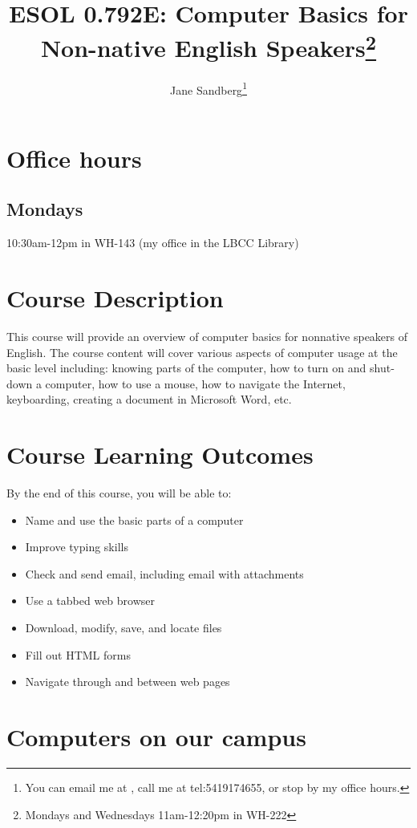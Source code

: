 \documentclass[12pt,article,oneside]{memoir}
\author{Jane Sandberg\thanks{You can email me at \htmladdnormallink{sandbej at linnbenton dot edu}{mailto:sandbej@linnbenton.edu}, call me at \htmladdnormallink{(541) 917 4655}	{tel:5419174655}, or stop by my office hours.}}
\title{ESOL 0.792E: Computer Basics for Non-native English Speakers\thanks{Mondays and Wednesdays 11am-12:20pm in WH-222}}
\begin{document}
\renewcommand{\labelitemi}{$\triangleright$}
\setcounter{secnumdepth}{0}
\tightlists


\maketitle

\begin{htmlonly}
\tableofcontents
\end{htmlonly}
\section{Office hours}

\subsection{Mondays}
10:30am-12pm in WH-143 (my office in the LBCC Library)

\section{Course Description}
This course will provide an overview of computer basics for non­native speakers of English. The course content will cover various aspects of computer usage at the basic level including: knowing parts of the computer, how to turn on and shut­down a computer, how to use a mouse, how to navigate the Internet, keyboarding, creating a document in Microsoft Word, etc.

\section{Course Learning Outcomes}
By the end of this course, you will be able to:
\begin{itemize}
 \item Name and use the basic parts of a computer
 \item Improve typing skills 
 \item Check and send email,  including email with attachments
 \item Use a tabbed web browser
 \item Download, modify, save, and locate files 
 \item Fill out HTML forms
 \item Navigate through and between web pages
\end{itemize}

\section{Computers on our campus}
\end{document}
